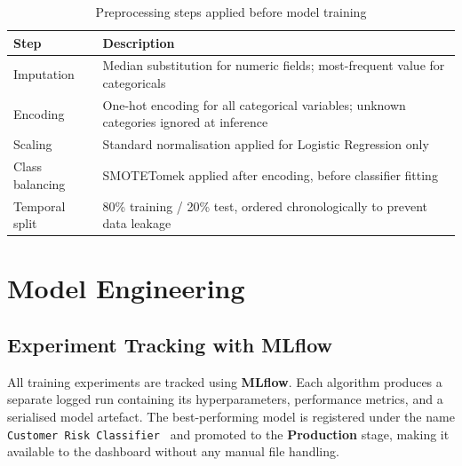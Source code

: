 \begin{table}[H]
\centering
\caption{Preprocessing steps applied before model training}
\label{tab:preprocessing}
\begin{tabular}{|l|p{9cm}|}
\hline
\textbf{Step} & \textbf{Description} \\
\hline
Imputation & Median substitution for numeric fields; most-frequent value for categoricals \\
Encoding & One-hot encoding for all categorical variables; unknown categories ignored at inference \\
Scaling & Standard normalisation applied for Logistic Regression only \\
Class balancing & SMOTETomek applied after encoding, before classifier fitting \\
Temporal split & 80\% training / 20\% test, ordered chronologically to prevent data leakage \\
\hline
\end{tabular}
\end{table}

\section{Model Engineering}
\label{sec:phase3_modeling}

\subsection{Experiment Tracking with MLflow}

All training experiments are tracked using \textbf{MLflow}. Each algorithm
produces a separate logged run containing its hyperparameters, performance
metrics, and a serialised model artefact. The best-performing model is
registered under the name \texttt{Customer Risk Classifier } and
promoted to the \textbf{Production} stage, making it available to the
dashboard without any manual file handling.

